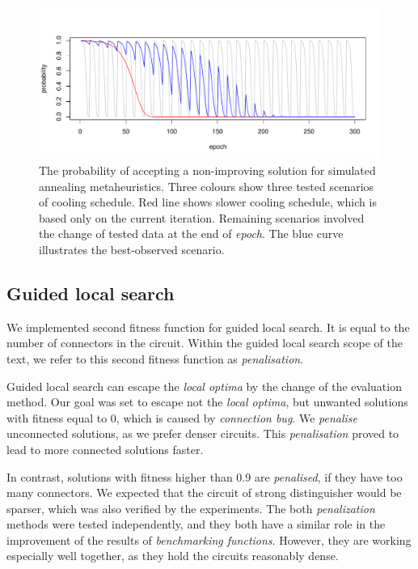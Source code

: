 \documentclass[
  print, %
  Table,   %
  nolof,     %
  nolot,     %
  11pt, %
  oneside  %
]{fithesis3}
\begin{document}
\begin{figure}
\centering
    \includegraphics[width=\textwidth]{./graphics/sa_prob}
    \caption{The probability of accepting a non-improving solution for simulated annealing metaheuristics. Three colours show three tested scenarios of cooling schedule. Red line shows slower cooling schedule, which is based only on the current iteration. Remaining scenarios involved the change of tested data at the end of \textit{epoch}. The blue curve illustrates the best-observed scenario.}
\label{fig:sa-cooling-scenarios}
\end{figure}

\subsection{Guided local search}
\label{subsec:res-ss-gls}

We implemented second fitness function for guided local search. It is equal to the number of connectors in the circuit. Within the guided local search scope of the text, we refer to this second fitness function as \textit{penalisation}.

Guided local search can escape the \textit{local optima} by the change of the evaluation method. Our goal was set to escape not the \textit{local optima}, but unwanted solutions with fitness equal to 0, which is caused by \textit{connection bug}. We \textit{penalise} unconnected solutions, as we prefer denser circuits. This \textit{penalisation} proved to lead to more connected solutions faster.

In contrast, solutions with fitness higher than 0.9 are \textit{penalised}, if they have too many connectors. We expected that the circuit of strong distinguisher would be sparser, which was also verified by the experiments. The both \textit{penalization} methods were tested independently, and they both have a similar role in the improvement of the results of \textit{benchmarking functions}. However, they are working especially well together, as they hold the circuits reasonably dense.
\end{document}
